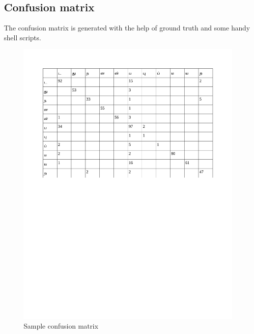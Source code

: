\subsection{Confusion matrix}
The confusion matrix is generated with the help of ground truth and some handy shell scripts.
\begin{figure}\centering
\includegraphics[scale=0.7]{./img/confuse}
  \caption{Sample confusion matrix}\label{CONF}
\end{figure}
